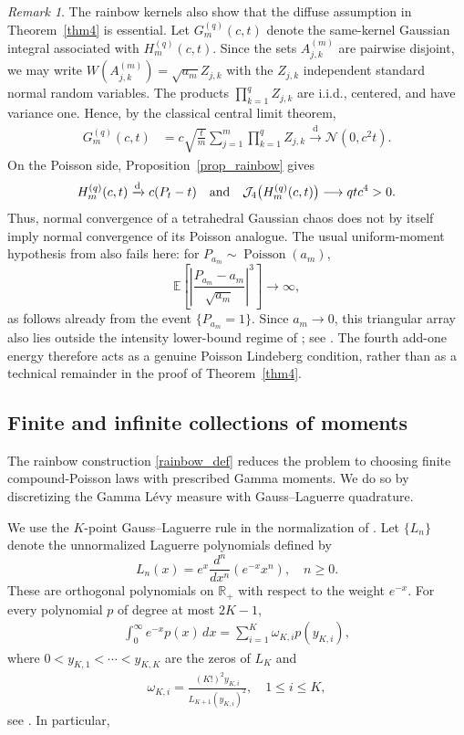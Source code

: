 \documentclass[letterpaper,11pt,reqno]{amsart}
\numberwithin{equation}{section}
\theoremstyle{plain}
\theoremstyle{definition}
\theoremstyle{remark}
\newtheorem{remark}[theorem]{Remark}
\newcommand{\E}{\mathbb{E}}
\newcommand{\R}{\mathbb{R}}
\newcommand{\NN}{\mathcal{N}}
\DeclareMathOperator{\Pois}{Poisson}
\newcommand{\noi}{\noindent}
\newcommand{\dd}{d}
\newcommand{\Jfour}{\mathcal J_4}
\newcommand{\AND}{\quad{\rm and}\quad}
\begin{document}
\begin{remark}\rm
\label{rem_inv_fail}
The rainbow kernels also show that the diffuse assumption in
Theorem~\ref{thm4} is essential.  Let $G_m^{(q)}(c,t)$ denote the
same-kernel Gaussian integral associated with
$H_m^{(q)}(c,t)$.  Since the sets $A_{j,k}^{(m)}$ are pairwise
disjoint, we may write
$W(A_{j,k}^{(m)})=\sqrt{a_m}Z_{j,k}$ with the $Z_{j,k}$ independent
standard normal random variables.  The products
$\prod_{k=1}^qZ_{j,k}$ are i.i.d., centered, and have variance one.
Hence, by the classical central limit theorem,
\noi
\begin{align*}
 G_m^{(q)}(c,t)
 &=c\sqrt{\frac{t}{m}}
 \sum_{j=1}^m\prod_{k=1}^qZ_{j,k}
 \xrightarrow{\mathrm d}\NN(0,c^2t).
\end{align*}
On the Poisson side, Proposition~\ref{prop_rainbow} gives
\noi
\begin{align*}
 H_m^{(q)}(c,t)\xrightarrow{\mathrm d}c(P_t-t)
 \AND
 \Jfour\bigl(H_m^{(q)}(c,t)\bigr)\longrightarrow qtc^4>0.
\end{align*}
Thus, normal convergence of a tetrahedral Gaussian chaos does not by
itself imply normal convergence of its Poisson analogue.  The usual
uniform-moment hypothesis from \cite{NPR10} also fails here: for
$P_{a_m}\sim\Pois(a_m)$,
\[
 \E\left[
 \left|\frac{P_{a_m}-a_m}{\sqrt{a_m}}\right|^3
 \right]\longrightarrow\infty,
\]
as follows already from the event $\{P_{a_m}=1\}$.  Since
$a_m\to0$, this triangular array also lies outside the intensity
lower-bound regime of \cite[Theorem~3.4]{PZ14}; see
\cite[Theorem~3.2 and Remark~3.3]{PZ14}.  The fourth add-one energy
therefore acts as a genuine Poisson
Lindeberg condition, rather than as a technical remainder in the
proof of Theorem~\ref{thm4}.
\end{remark}

\subsection{Finite and infinite collections of moments}
\label{SEC_36}

The rainbow construction \eqref{rainbow_def} reduces the problem to choosing finite
compound-Poisson laws with prescribed Gamma moments.  We do so
by discretizing the Gamma L\'evy measure with Gauss--Laguerre
quadrature.

We use the $K$-point Gauss--Laguerre rule in the normalization of
\cite[Section~10.5]{QSS07}.  Let $\{L_n\}$ denote the unnormalized
Laguerre polynomials defined by
\[
 L_n(x)=e^x\frac{\dd^n}{\dd x^n}(e^{-x}x^n),
 \quad n\geq0.
\]
These are orthogonal polynomials on $\R_+$ with respect to the weight
$e^{-x}$.  For every polynomial $p$ of degree at most $2K-1$,
\begin{align}\label{GL_exp}
 \int_0^\infty e^{-x}p(x)\,\dd x
 =\sum_{i=1}^K\omega_{K,i}p(y_{K,i}),
\end{align}
where $0<y_{K,1}<\cdots<y_{K,K}$ are the zeros of $L_K$ and
\noi
\begin{align*}
 \omega_{K,i}
 =\frac{(K!)^2y_{K,i}}{L_{K+1}(y_{K,i})^2},
 \quad 1\leq i\leq K,
\end{align*}
see \cite[(10.41)]{QSS07}.  In particular,
\end{document}
